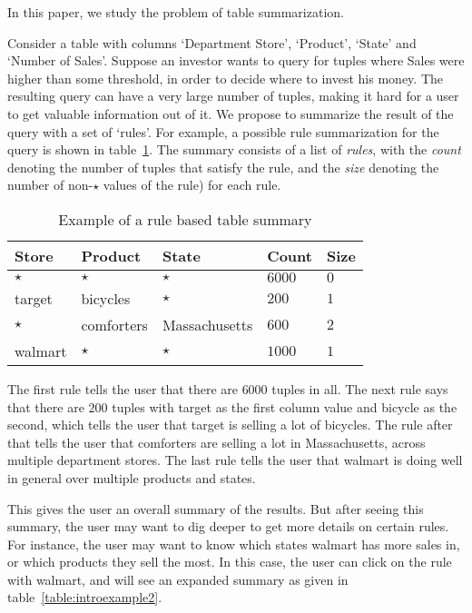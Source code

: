 \documentclass{sig-alternate}
\begin{document}
In this paper, we study the problem of table summarization.

Consider a table with columns `Department Store', `Product', `State' and `Number of Sales'. Suppose an investor wants to query for tuples where Sales were higher than some threshold, in order to decide where to invest his money. The resulting query can have a very large number of tuples, making it hard for a user to get valuable information out of it. We propose to summarize the result of the query with a set of `rules'. For example, a possible rule summarization for the query is shown in table~\ref{table:introexample}. The summary consists of a list of \textit{rules}, with the \textit{count} denoting the number of tuples that satisfy the rule, and the \textit{size} denoting the number of non-$\star$ values of the rule) for each rule.

\begin{table}
\centering
\begin{tabular}{| l | l | l | l | l |}
\hline Store & Product & State & Count & Size \\
\hline
$\star$ & $\star$ & $\star$ & $6000$ & $0$ \\ \hline
target & bicycles & $\star$ & $200$ & $1$ \\ \hline
$\star$ & comforters & Massachusetts & $600$ & $2$ \\ \hline
walmart & $\star$ & $\star$ & $1000$ & $1$ \\ \hline
\end{tabular}
\caption{Example of a rule based table summary \label{table:introexample}}
\end{table}

The first rule tells the user that there are $6000$ tuples in all. 
The next rule says that there are $200$ tuples with target as the first column value and bicycle as the second, which tells the user that target is selling a lot of bicycles. The rule after that tells the user that comforters are selling a lot in Massachusetts, across multiple department stores. The last rule tells the user that walmart is doing well in general over multiple products and states. 

This gives the user an overall summary of the results. But after seeing this summary, the user may want to dig deeper to get more details on certain rules. For instance, the user may want to know which states walmart has more sales in, or which products they sell the most. In this case, the user can click on the rule with walmart, and will see an expanded summary as given in table~\ref{table:introexample2}. 
\end{document}
